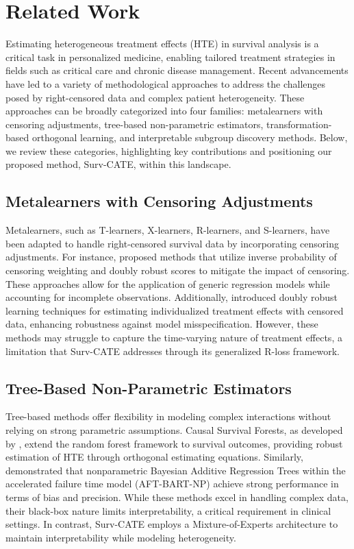 \documentclass{article}
\begin{document}
\section{Related Work}

Estimating heterogeneous treatment effects (HTE) in survival analysis is a critical task in personalized medicine, enabling tailored treatment strategies in fields such as critical care and chronic disease management. Recent advancements have led to a variety of methodological approaches to address the challenges posed by right-censored data and complex patient heterogeneity. These approaches can be broadly categorized into four families: metalearners with censoring adjustments, tree-based non-parametric estimators, transformation-based orthogonal learning, and interpretable subgroup discovery methods. Below, we review these categories, highlighting key contributions and positioning our proposed method, Surv-CATE, within this landscape.

\subsection{Metalearners with Censoring Adjustments}

Metalearners, such as T-learners, X-learners, R-learners, and S-learners, have been adapted to handle right-censored survival data by incorporating censoring adjustments. For instance, \citet{xu2023treatment} proposed methods that utilize inverse probability of censoring weighting and doubly robust scores to mitigate the impact of censoring. These approaches allow for the application of generic regression models while accounting for incomplete observations. Additionally, \citet{zhao2015doubly} introduced doubly robust learning techniques for estimating individualized treatment effects with censored data, enhancing robustness against model misspecification. However, these methods may struggle to capture the time-varying nature of treatment effects, a limitation that Surv-CATE addresses through its generalized R-loss framework.

\subsection{Tree-Based Non-Parametric Estimators}

Tree-based methods offer flexibility in modeling complex interactions without relying on strong parametric assumptions. Causal Survival Forests, as developed by \citet{cui2023estimating}, extend the random forest framework to survival outcomes, providing robust estimation of HTE through orthogonal estimating equations. Similarly, \citet{hu2020estimating} demonstrated that nonparametric Bayesian Additive Regression Trees within the accelerated failure time model (AFT-BART-NP) achieve strong performance in terms of bias and precision. While these methods excel in handling complex data, their black-box nature limits interpretability, a critical requirement in clinical settings. In contrast, Surv-CATE employs a Mixture-of-Experts architecture to maintain interpretability while modeling heterogeneity.
\end{document}
